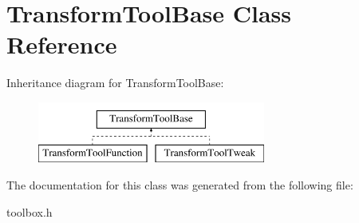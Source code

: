 \hypertarget{class_transform_tool_base}{\section{Transform\-Tool\-Base Class Reference}
\label{class_transform_tool_base}
}
Inheritance diagram for Transform\-Tool\-Base\-:\begin{figure}[H]
\begin{center}
\leavevmode
\includegraphics[height=2.000000cm]{class_transform_tool_base}
\end{center}
\end{figure}


The documentation for this class was generated from the following file\-:\begin{DoxyCompactItemize}
\item 
toolbox.\-h\end{DoxyCompactItemize}
